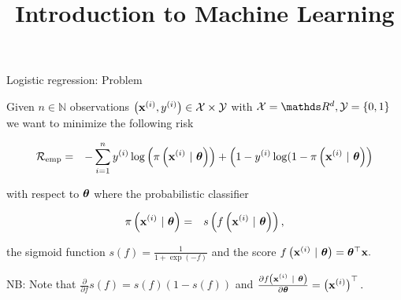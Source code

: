 \documentclass[11pt,compress,t,notes=noshow, xcolor=table]{beamer}
\title{Introduction to Machine Learning}
\institute{\href{https://compstat-lmu.github.io/lecture_i2ml/}{compstat-lmu.github.io/lecture\_i2ml}}
\date{}
\begin{document}


\begin{vbframe}{Logistic regression: Problem}

Given $n \in \mathbb{N}$ observations $\left(\mathbf{x}^{(i)}, y^{(i)}\right) \in \mathcal{X} \times \mathcal{Y}$ with  $\Xspace = \R^d, \Yspace = \{0, 1\}$ we want to minimize the following risk 


\vspace*{-0.5cm}

\begin{eqnarray*}
  \mathcal{R}_{\text{emp}}  & = & 
  -\sum^n_{i=1} y^{(i)}\log\left(\pi\left(\mathbf{x}^{(i)} ~|~ \bm{\theta}\right)\right) + \left(1-y^{(i)}\log(1-\pi\left(\mathbf{x}^{(i)} ~|~ \bm{\theta}\right)\right)
\end{eqnarray*}

with respect to $\bm{\theta}$ where the probabilistic classifier

\begin{eqnarray*}
  \pi\left(\mathbf{x}^{(i)} ~|~ \bm{\theta}\right)  & = & 
 s\left(f\left(\mathbf{x}^{(i)} ~|~ \bm{\theta}\right)\right),
\end{eqnarray*}

the sigmoid function $s(f) = \frac{1}{1 + \exp(-f)}$ and the score $f\left(\mathbf{x}^{(i)} ~|~ \bm{\theta}\right) = \bm{\theta}^\top \mathbf{x}.$

\vspace*{0.5cm} 

NB: Note that $\frac{\partial}{\partial f} s(f) = s(f)(1-s(f))$ and $\frac{\partial f\left(\mathbf{x}^{(i)} ~|~ \bm{\theta}\right)}{\partial \bm{\theta}} = \left(\mathbf{x}^{(i)}\right)^\top.$

\end{vbframe}
\end{document}

